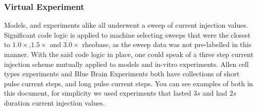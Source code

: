 \subsubsection{Virtual Experiment} 
Models, and experiments alike all underwent a sweep of current injection values. Significant code logic is applied to machine selecting sweeps that were the closest to $1.0\times $,$1.5\times$ and $3.0 \times$ rheobase, as the sweep data was not pre-labelled in this manner. With the said code logic in place, one could speak of a three step current injection scheme  mutually applied to models and in-vitro experiments. 
Allen cell types experiments and Blue Brain Experiments both have collections of short pulse current steps, and long pulse current steps. You can see examples of both in this document, for simplicity we used experiments that lasted $3s$ and had $2s$ duration current injection values.

%